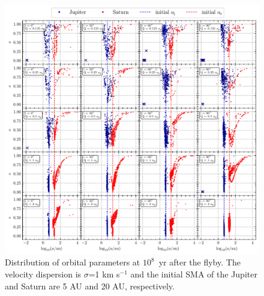 \documentclass[twocolumn]{aastex63}
\begin{document}
\begin{figure}
    \includegraphics[width=\textwidth]{figs/ae-1e8.pdf}
    \caption{ Distribution of orbital parameters at $10^8$~yr after the flyby. The velocity dispersion is $\sigma$=1 km s$^{-1}$ and the initial SMA of the Jupiter and Saturn are 5 AU and 20 AU, respectively.}
    \label{fig:a-et8}
\end{figure}


\end{document}
